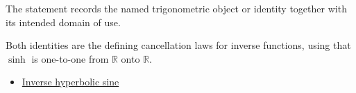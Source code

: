 \begin{remark*}[Interpretation]
The statement records the named trigonometric object or identity together with
its intended domain of use.
\end{remark*}

\begin{remark*}[Proof]
Both identities are the defining cancellation laws for inverse functions,
using that $\sinh$ is one-to-one from $\mathbb{R}$ onto $\mathbb{R}$.
\end{remark*}
\begin{dependencies}
\begin{itemize}
  \item \hyperref[def:inverse-hyperbolic-sine]{Inverse hyperbolic sine}
\end{itemize}
\end{dependencies}
